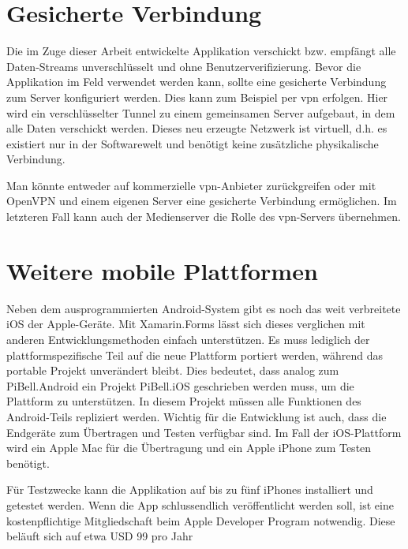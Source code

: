 \section{Gesicherte Verbindung}%
Die im Zuge dieser Arbeit entwickelte Applikation verschickt bzw. empfängt alle Daten-Streams unverschlüsselt und ohne Benutzerverifizierung.
Bevor die Applikation im Feld verwendet werden kann, sollte eine gesicherte Verbindung zum Server konfiguriert werden.
Dies kann zum Beispiel per \ac{vpn} erfolgen.
Hier wird ein verschlüsselter Tunnel zu einem gemeinsamen Server aufgebaut, in dem alle Daten verschickt werden.
Dieses neu erzeugte Netzwerk ist virtuell, d.h. es existiert nur in der Softwarewelt und benötigt keine zusätzliche physikalische Verbindung.\par
Man könnte entweder auf kommerzielle \ac{vpn}-Anbieter zurückgreifen oder mit Open\-VPN und einem eigenen Server eine gesicherte Verbindung ermöglichen.
Im letzteren Fall kann auch der Medienserver die Rolle des \ac{vpn}-Servers übernehmen.
\section{Weitere mobile Plattformen}
Neben dem ausprogrammierten Android-System gibt es noch das weit verbreitete iOS der Apple-Geräte.
Mit Xamarin.Forms lässt sich dieses verglichen mit anderen Entwicklungsmethoden einfach unterstützen.
Es muss lediglich der plattformspezifische Teil auf die neue Plattform portiert werden, während das portable Projekt unverändert bleibt.
Dies bedeutet, dass analog zum PiBell.Android ein Projekt PiBell.iOS geschrieben werden muss, um die Plattform zu unterstützen.
In diesem Projekt müssen alle Funktionen des Android-Teils repliziert werden.
Wichtig für die Entwicklung ist auch, dass die Endgeräte zum Übertragen und Testen verfügbar sind.
Im Fall der iOS-Plattform wird ein Apple Mac für die Übertragung und ein Apple iPhone zum Testen benötigt.\par

Für Testzwecke kann die Applikation auf bis zu fünf iPhones installiert und getestet werden.
Wenn die App schlussendlich veröffentlicht werden soll, ist eine kostenpflichtige Mitgliedschaft beim Apple Developer Program notwendig.
Diese beläuft sich auf etwa USD 99 pro Jahr \cite[vgl.][Integrated Development Environment Availability]{msdoc-xamarin-fundamentals}
